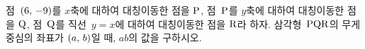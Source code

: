 점~$(6,\mkern3mu -9)$를 $x$축에 대하여 대칭이동한 점을 $\mathrm{P}$, 점~$\mathrm{P}$를 $y$축에 대하여 대칭이동한 점을 $\mathrm{Q}$, 점~$\mathrm{Q}$를 직선~$y=x$에 대하여 대칭이동한 점을 $\mathrm{R}$라 하자. 삼각형~$\mathrm{PQR}$의 무게중심의 좌표가 $(a,\mkern3mu b)$일 때, $ab$의 값을 구하시오.
